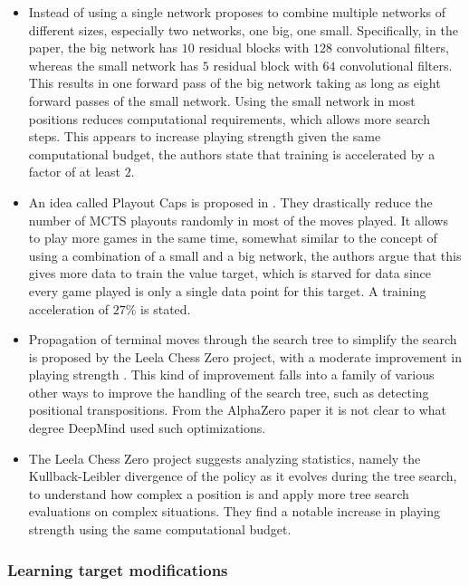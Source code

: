 \documentclass[12pt,onecolumn,oneside,titlepage]{article}
\begin{document}
\begin{itemize}
 \item Instead of using a single network \cite{lan2019multiple} proposes to combine multiple networks of different sizes, especially two networks, one big, one small. Specifically, in the paper, the 
 big network has $10$ residual blocks with $128$ convolutional filters, whereas the small network has $5$ residual block with $64$ convolutional filters. This results in one forward pass of the big network taking as long as eight forward passes of the small network.
 Using the small network in most positions reduces computational requirements, 
 which allows more search steps. This appears to increase playing strength given the same computational budget, the authors state that training is accelerated by a factor of at least $2$.
 \item An idea called Playout Caps is proposed in \cite{wu2019accelerating}. They drastically reduce the number of MCTS playouts randomly in most of the moves played. It allows to play more games in the same time, somewhat similar to 
 the concept of using a combination of a small and a big network, the authors argue that this gives more data to train the value target, which is starved for data since every game played is only a single data point for this target. A training acceleration of $27\%$ is stated.
 \item Propagation of terminal moves through the search tree to simplify the search is proposed by the Leela Chess Zero project, with a moderate improvement in playing strength \cite{leela0propagation}. This kind of improvement falls
 into a family of various other ways to improve the handling of the search tree, such as detecting positional transpositions. From the AlphaZero paper it is not clear to what degree DeepMind used such optimizations.
 \item The Leela Chess Zero project suggests analyzing statistics, namely the Kullback-Leibler divergence of the policy as it evolves during the tree search, to understand how complex a position is and apply more tree search evaluations on complex situations. They find a notable increase
   in playing strength \cite{leela0kldgain} using the same computational budget.
\end{itemize}

\subsubsection{Learning target modifications}
\end{document}
